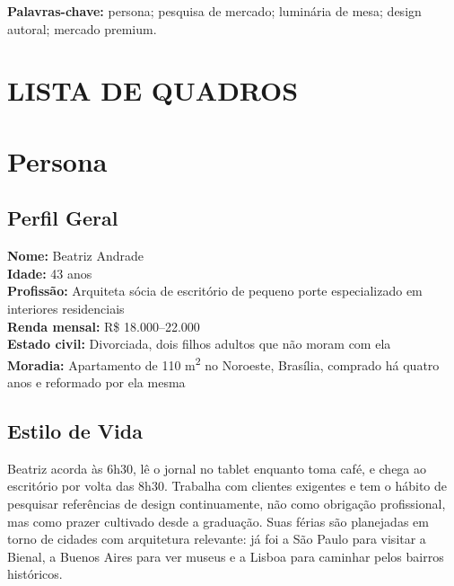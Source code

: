 \documentclass[
  12pt,
  a4paper,
  oneside,
  brazil
]{article}
\makeatletter
\let\oldsection\section
\renewcommand{\section}{\clearpage\oldsection}
\renewcommand{\listofquadros}{%
  \section*{LISTA DE QUADROS}%
  \@starttoc{loq}%
}
\makeatother
\begin{document}
\vspace{1em}
\noindent\textbf{Palavras-chave:} persona; pesquisa de mercado; luminária de mesa;
design autoral; mercado premium.

\clearpage
\thispagestyle{empty}
\listofquadros

\clearpage
\thispagestyle{empty}
\tableofcontents


\section{Persona}

\subsection{Perfil Geral}

\noindent\textbf{Nome:} Beatriz Andrade\\[0.3em]
\noindent\textbf{Idade:} 43 anos\\[0.3em]
\noindent\textbf{Profissão:} Arquiteta sócia de escritório de pequeno porte
especializado em interiores residenciais\\[0.3em]
\noindent\textbf{Renda mensal:} R\$ 18.000--22.000\\[0.3em]
\noindent\textbf{Estado civil:} Divorciada, dois filhos adultos que não moram
com ela\\[0.3em]
\noindent\textbf{Moradia:} Apartamento de 110 m\textsuperscript{2} no Noroeste,
Brasília, comprado há quatro anos e reformado por ela mesma

\subsection{Estilo de Vida}

Beatriz acorda às 6h30, lê o jornal no tablet enquanto toma café, e chega ao
escritório por volta das 8h30. Trabalha com clientes exigentes e tem o hábito de
pesquisar referências de design continuamente, não como obrigação profissional, mas
como prazer cultivado desde a graduação. Suas férias são planejadas em torno de
cidades com arquitetura relevante: já foi a São Paulo para visitar a Bienal, a
Buenos Aires para ver museus e a Lisboa para caminhar pelos bairros históricos.
\end{document}
